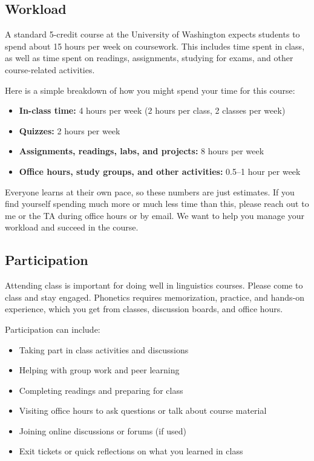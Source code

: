 \documentclass[12pt, letterpaper]{article}
\begin{document}
\subsection*{Workload} \label{sec:workload}

A standard 5-credit course at the University of Washington expects students to spend about 15 hours per week on coursework. This includes time spent in class, as well as time spent on readings, assignments, studying for exams, and other course-related activities.

Here is a simple breakdown of how you might spend your time for this course:
\begin{itemize}
    \item \textbf{In-class time:} 4 hours per week (2 hours per class, 2 classes per week)
    \item \textbf{Quizzes:} 2 hours per week
    \item \textbf{Assignments, readings, labs, and projects:} 8 hours per week
    \item \textbf{Office hours, study groups, and other activities:} 0.5–1 hour per week
\end{itemize}

Everyone learns at their own pace, so these numbers are just estimates. If you find yourself spending much more or much less time than this, please reach out to me or the TA during office hours or by email. We want to help you manage your workload and succeed in the course.

\subsection*{Participation} \label{sec:participation}

Attending class is important for doing well in linguistics courses. Please come to class and stay engaged. Phonetics requires memorization, practice, and hands-on experience, which you get from classes, discussion boards, and office hours.

Participation can include:
\begin{itemize}
    \item Taking part in class activities and discussions
    \item Helping with group work and peer learning
    \item Completing readings and preparing for class
    \item Visiting office hours to ask questions or talk about course material
    \item Joining online discussions or forums (if used)
    \item Exit tickets or quick reflections on what you learned in class
\end{itemize}
\end{document}

